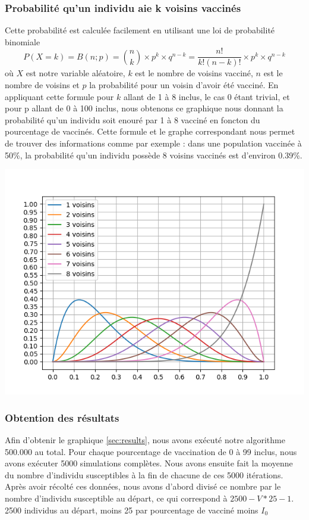 \documentclass[10pt]{article}
\begin{document}
\subsubsection{Probabilité qu'un individu aie k voisins vaccinés}
Cette probabilité est calculée facilement en utilisant une loi de probabilité binomiale $$P(X = k) = B(n;p) = {n \choose k}\times p^k \times q^{n-k} = \frac{n!}{k!(n-k)!}\times p^k \times q^{n-k}$$ où $X$ est notre variable aléatoire, $k$ est le nombre de voisins vacciné, $n$ est le nombre de voisins et $p$ la probabilité pour un voisin d'avoir été vacciné. En appliquant cette formule pour $k$ allant de 1 à 8 inclus, le cas 0 étant trivial, et pour p allant de 0 à 100 inclus, nous obtenons ce graphique nous donnant la probabilité qu'un individu soit enouré par 1 à 8 vacciné en foncton du pourcentage de vaccinés. Cette formule et le graphe correspondant nous permet de trouver des informations comme par exemple : dans une population vaccinée à 50\%, la probabilité qu'un individu possède 8 voisins vaccinés est d'environ 0.39\%.

\includegraphics[scale=0.6]{probNeighbour.png}

\subsubsection{Obtention des résultats}
Afin d'obtenir le graphique \ref{sec:results}, nous avons exécuté notre algorithme 500.000 au total. Pour chaque pourcentage de vaccination de 0 à 99 inclus, nous avons exécuter 5000 simulations complètes. Nous avons ensuite fait la moyenne du nombre d'individu susceptibles à la fin de chacune de ces 5000 itérations.
Après avoir récolté ces données, nous avons d'abord divisé ce nombre par le nombre d'individu susceptible au départ, ce qui correspond à $2500-V*25-1$. 2500 individus au départ, moins 25 par pourcentage de vacciné moins $I_0$
\end{document}
